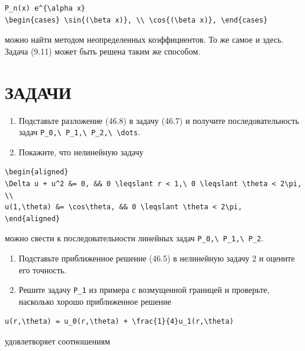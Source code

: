 \documentclass[
  ukrainian,
]{article}
\begin{document}
\begin{verbatim}
P_n(x) e^{\alpha x}
\begin{cases} \sin{(\beta x)}, \\ \cos{(\beta x)}, \end{cases}
\end{verbatim}

можно найти методом неопределенных коэффициентов. То же самое и здесь.
Задача (9.11) может быть решена таким же способом.

\section{ЗАДАЧИ}\label{ux437ux430ux434ux430ux447ux438}

\begin{enumerate}
\def\labelenumi{\arabic{enumi}.}
\item
  Подставьте разложение (46.8) в задачу (46.7) и получите
  последовательность задач
  \texttt{P\_0,\textbackslash{}\ P\_1,\textbackslash{}\ P\_2,\textbackslash{}\ \textbackslash{}dots}.
\item
  Покажите, что нелинейную задачу
\end{enumerate}

\begin{verbatim}
\begin{aligned}
\Delta u + u^2 &= 0, && 0 \leqslant r < 1,\ 0 \leqslant \theta < 2\pi, \\
u(1,\theta) &= \cos\theta, && 0 \leqslant \theta < 2\pi,
\end{aligned}
\end{verbatim}

можно свести к последовательности линейных задач
\texttt{P\_0,\textbackslash{}\ P\_1,\textbackslash{}\ P\_2}.

\begin{enumerate}
\def\labelenumi{\arabic{enumi}.}
\setcounter{enumi}{2}
\item
  Подставьте приближенное решение (46.5) в нелинейную задачу 2 и оцените
  его точность.
\item
  Решите задачу \texttt{P\_1} из примера с возмущенной границей и
  проверьте, насколько хорошо приближенное решение
\end{enumerate}

\begin{verbatim}
u(r,\theta) = u_0(r,\theta) + \frac{1}{4}u_1(r,\theta)
\end{verbatim}

удовлетворяет соотношениям
\end{document}
